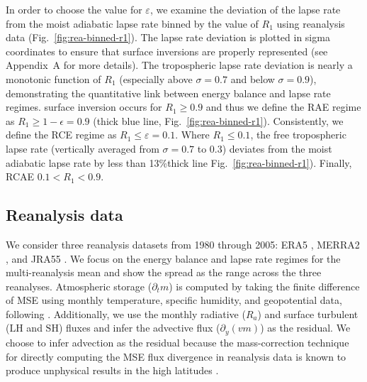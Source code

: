 \documentclass{ametsocV5}
\begin{document}
    In order to choose the value for $\varepsilon$, we examine the deviation of the lapse rate from the moist adiabatic lapse rate binned by the value of $R_1$ using reanalysis data (Fig.~\ref{fig:rea-binned-r1}). The lapse rate deviation is plotted in sigma coordinates to ensure that surface inversions are properly represented (see Appendix~A for more details). The tropospheric lapse rate deviation is nearly a monotonic function of $R_1$ (especially above $\sigma=0.7$ and below $\sigma=0.9$), demonstrating the quantitative link between energy balance and lapse rate regimes.  surface inversion occurs for $R_1 \ge 0.9$ and thus we define the RAE regime as $R_1\ge1-\epsilon=0.9$ (thick blue line, Fig.~\ref{fig:rea-binned-r1}). Consistently, we define the RCE regime as $R_1\le\varepsilon=0.1$. Where $R_1\le 0.1$, the free tropospheric lapse rate (vertically averaged from $\sigma=0.7$ to 0.3) deviates from the moist adiabatic lapse rate by less than 13\%\replaced{, }{ (}thick  line Fig.~\ref{fig:rea-binned-r1}). Finally, RCAE $0.1<R_1<0.9$.

    \subsection{Reanalysis data}\label{subsec:reanalysis}
    We consider three reanalysis datasets from 1980 through 2005: ERA5 \citep{hersbach2020}, MERRA2 \citep{gelaro2017}, and JRA55 \citep{kobayashi2015}. We focus on the energy balance and lapse rate regimes for the multi-reanalysis mean and show the spread as the range across the three reanalyses. Atmospheric storage ($\partial_t m$) is computed by taking the finite difference of MSE using monthly temperature, specific humidity, and geopotential data, following \cite{donohoe2013}. Additionally, we use the monthly radiative ($R_a$) and surface turbulent ($\mathrm{LH}$ and $\mathrm{SH}$) fluxes and infer the advective flux ($\partial_y (vm)$) as the residual. We choose to infer advection as the residual because the mass-correction technique for directly computing the MSE flux divergence in reanalysis data is known to produce unphysical results in the high latitudes \citep{porter2010}. 
\end{document}
